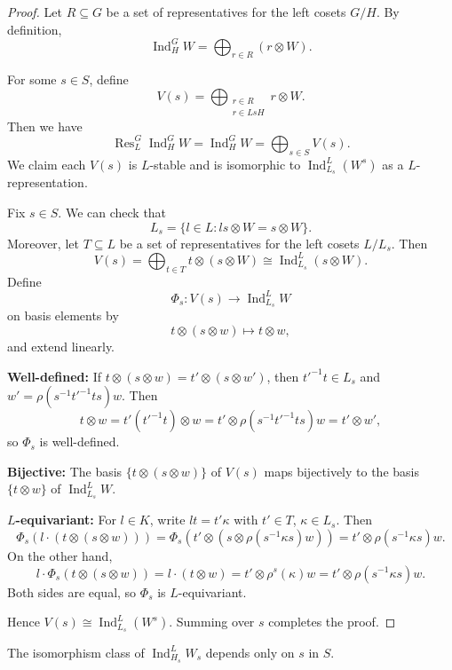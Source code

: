 \begin{proof}
Let \(R \subseteq G\) be a set of representatives for the left cosets \(G/H\). By definition,
\[
\operatorname{Ind}_H^G W = \bigoplus_{r \in R} (r \otimes W).
\]

For some $s\in S$, define
\[
V(s) = \bigoplus_{\substack{r \in R \\ r \in L s H}} r \otimes W.
\]
Then we have
\[
\operatorname{Res}_L^G \operatorname{Ind}_H^G W = \operatorname{Ind}_H^G W=\bigoplus_{s \in S} V(s).
\]
We claim each \(V(s)\) is \(L\)-stable and is isomorphic to \(\operatorname{Ind}_{L_s}^L (W^s)\) as a \(L\)-representation.

Fix \(s \in S\). We can check that
\[
L_s = \{ l \in L: l s \otimes W = s \otimes W \} .
\]
Moreover, let \(T \subseteq L\) be a set of representatives for the left cosets $L/L_s$. Then\[V(s) = \bigoplus_{t \in T} t\otimes (s \otimes W)\cong \operatorname{Ind}_{L_s}^L (s \otimes W).\]
Define
\[
\Phi_s: V(s) \to \operatorname{Ind}_{L_s}^L W
\]
on basis elements by
\[
t\otimes (s \otimes w)\mapsto t \otimes w,
\]
and extend linearly.

\medskip
\noindent\textbf{Well-defined:} If \(t \otimes (s \otimes w) = t' \otimes (s \otimes w')\), then \(t'^{-1} t \in L_s\) and \(w' = \rho(s^{-1} t'^{-1} t s) w\). Then
\[
t \otimes w = t' (t'^{-1} t) \otimes w = t' \otimes \rho(s^{-1} t'^{-1} t s) w = t' \otimes w',
\]
so \(\Phi_s\) is well-defined.

\medskip
\noindent\textbf{Bijective:} The basis \(\{t \otimes (s \otimes w)\}\) of \(V(s)\) maps bijectively to the basis \(\{t \otimes w\}\) of \(\operatorname{Ind}_{L_s}^L W\).

\medskip
\noindent\textbf{\(L\)-equivariant:} For \(l \in K\), write \(l t = t' \kappa\) with \(t' \in T\), \(\kappa \in L_s\). Then
\[
\Phi_s(l \cdot (t\otimes( s \otimes w))) = \Phi_s(t'\otimes( s \otimes \rho(s^{-1} \kappa s) w)) = t' \otimes \rho(s^{-1} \kappa s) w.
\]
On the other hand,
\[
l \cdot \Phi_s(t\otimes( s \otimes w)) = l \cdot (t \otimes w) = t' \otimes \rho^s(\kappa) w = t' \otimes \rho(s^{-1} \kappa s) w.
\]
Both sides are equal, so \(\Phi_s\) is \(L\)-equivariant.

Hence \(V(s) \cong \operatorname{Ind}_{L_s}^L(W^s)\). Summing over \(s\) completes the proof.
\end{proof}

\begin{remark}
The isomorphism class of \(\operatorname{Ind}_{H_s}^L W_s\) depends only on \(s\) in \(S\).
\end{remark}

